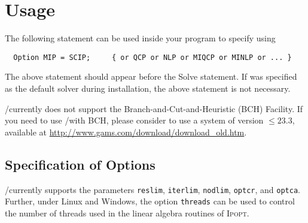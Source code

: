 \section{Usage}

The following statement can be used inside your \GAMS program to specify using \SCIP
\begin{verbatim}
  Option MIP = SCIP;     { or QCP or NLP or MIQCP or MINLP or ... }
\end{verbatim}

The above statement should appear before the Solve statement.
If \SCIP was specified as the default solver during \GAMS installation, the above statement is not necessary.

%

\GAMS/\SCIP currently does not support the \GAMS Branch-and-Cut-and-Heuristic (BCH) Facility.
If you need to use \GAMS/\SCIP with BCH, please consider to use a \GAMS system of version $\leq 23.3$, available at \url{http://www.gams.com/download/download_old.htm}.

\subsection{Specification of \SCIP Options}

\GAMS/\SCIP currently supports the \GAMS parameters \texttt{reslim}, \texttt{iterlim}, \texttt{nodlim}, \texttt{optcr}, and \texttt{optca}.
Further, under Linux and Windows, the option \texttt{threads} can be used to control the number of threads used in the linear algebra routines of \textsc{Ipopt}.

